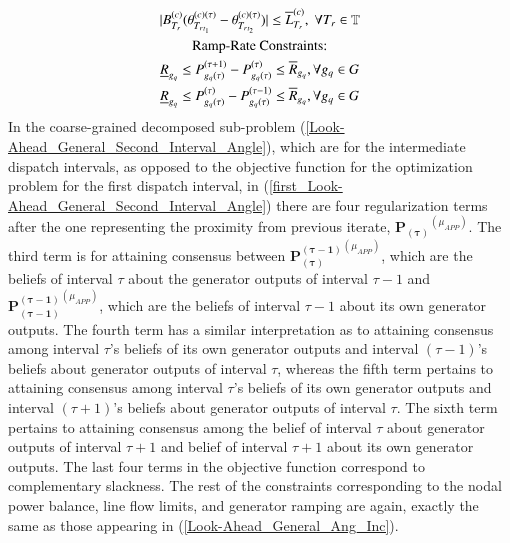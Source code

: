 \documentclass[preprint,12pt,3p]{elsarticle}
\begin{document}
\begin{subequations}
\begin{gather}
|B_{T_r}^{(c)}(\theta_{{T_r}_{t_1}}^{(c)(\tau)}-\theta_{{T_r}_{t_2}}^{(c)(\tau)})|\leq{{\overline{L}}_{T_r}^{(c)}},\;\forall{T_r\in{\mathbb{T}}}\label{third1_Look-Ahead_General_Second_Interval_Angle}\\
\text{Ramp-Rate Constraints:}\notag\\
\underline{R}_{g_q}\leq P_{{g_q}(\tau)}^{(\tau+1)}-P_{{g_q}(\tau)}^{(\tau)}\leq \overline{R}_{g_q},\forall {g_q}\in G\label{fourth_Look-Ahead_General_Second_Interval_Angle}\\
\underline{R}_{g_q}\leq P_{{g_q}(\tau)}^{(\tau)}-P_{{g_q}(\tau)}^{(\tau-1)}\leq \overline{R}_{g_q},\forall {g_q}\in G\label{fifth_Look-Ahead_General_Second_Interval_Angle}
\end{gather}
\end{subequations}
In the coarse-grained decomposed sub-problem (\ref{Look-Ahead_General_Second_Interval_Angle}), which are for the intermediate dispatch intervals, as opposed to the objective function for the optimization problem for the first dispatch interval, in  (\ref{first_Look-Ahead_General_Second_Interval_Angle}) there are four regularization terms after the one representing the proximity from previous iterate, $\mathbf{P_{(\tau)}}^{(\mu_{APP})}$. The third term is for attaining consensus between $\mathbf{P_{(\tau)}^{(\tau-1)}}^{(\mu_{APP})}$, which are the beliefs of interval $\tau$ about the generator outputs of interval $\tau-1$ and $\mathbf{P_{(\tau-1)}^{(\tau-1)}}^{(\mu_{APP})}$, which are the beliefs of interval $\tau-1$ about its own generator outputs.  The fourth term has a similar interpretation as to attaining consensus among interval $\tau$'s beliefs of its own generator outputs and interval $(\tau-1)$'s beliefs about generator outputs of interval $\tau$, whereas the fifth term pertains to attaining consensus among interval $\tau$'s beliefs of its own generator outputs and interval $(\tau+1)$'s beliefs about generator outputs of interval $\tau$. The sixth term pertains to attaining consensus among the belief of interval $\tau$ about generator outputs of interval $\tau+1$ and belief of interval $\tau+1$ about its own generator outputs. The last four terms in the objective function correspond to complementary slackness. The rest of the constraints corresponding to the nodal power balance, line flow limits, and generator ramping are again, exactly the same as those appearing in (\ref{Look-Ahead_General_Ang_Inc}).\\
\end{document}
